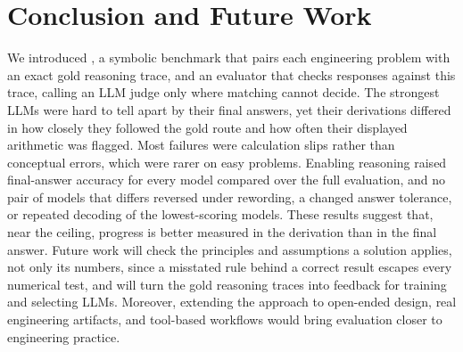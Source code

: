 \section{Conclusion and Future Work}
\label{sec:conclusion}

We introduced \ourdataset, a symbolic benchmark that pairs each engineering problem with an exact
gold reasoning trace, and an evaluator that checks responses against this trace, calling an LLM
judge only where matching cannot decide.
The strongest LLMs were hard to tell apart by their final answers, yet their derivations differed in
how closely they followed the gold route and how often their displayed arithmetic was flagged.
Most failures were calculation slips rather than conceptual errors, which were rarer on easy
problems.
Enabling reasoning raised final-answer accuracy for every model compared over the full evaluation,
and no pair of models that differs reversed under rewording, a changed answer tolerance, or repeated
decoding of the lowest-scoring models.
These results suggest that, near the ceiling, progress is better measured in the derivation than in
the final answer.
Future work will check the principles and assumptions a solution applies, not only its numbers,
since a misstated rule behind a correct result escapes every numerical test, and will turn the gold
reasoning traces into feedback for training and selecting LLMs.
Moreover, extending the approach to open-ended design, real engineering artifacts, and tool-based
workflows would bring evaluation closer to engineering practice.
